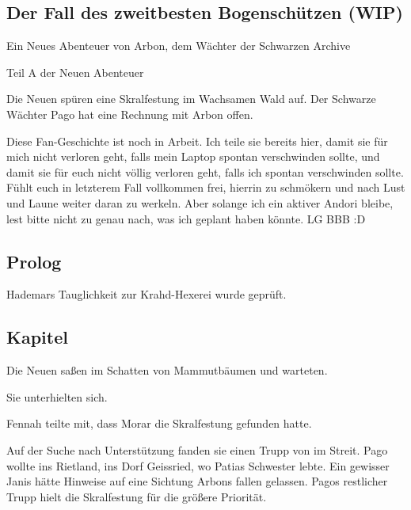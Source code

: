 \begin{chapterbox}
    \chapter{Der Fall des zweitbesten Bogenschützen (WIP)}
    \label{wip-der-fall-des-zweitbesten-bogenschuetzen}
    
    \begin{center}
        Ein Neues Abenteuer von Arbon, dem Wächter der Schwarzen Archive

        Teil A der Neuen Abenteuer
    \end{center}

    Die Neuen  spüren eine Skralfestung im Wachsamen Wald auf. Der Schwarze Wächter Pago hat eine Rechnung mit Arbon offen.
\end{chapterbox}



Diese Fan-Geschichte ist noch in Arbeit. Ich teile sie bereits hier, damit sie für mich nicht verloren geht, falls mein Laptop spontan verschwinden sollte, und damit sie für euch nicht völlig verloren geht, falls ich spontan verschwinden sollte. Fühlt euch in letzterem Fall vollkommen frei, hierrin zu schmökern und nach Lust und Laune weiter daran zu werkeln. Aber solange ich ein aktiver Andori bleibe, lest bitte nicht zu genau nach, was ich geplant haben könnte. LG BBB :D



\newpage
\section{Prolog}


Hademars Tauglichkeit zur Krahd-Hexerei wurde geprüft.



\newpage
\section{Kapitel}


Die Neuen  saßen im Schatten von Mammutbäumen und warteten.

Sie unterhielten sich.

Fennah teilte mit, dass Morar die Skralfestung gefunden hatte.

Auf der Suche nach Unterstützung fanden sie einen Trupp von  im Streit. Pago wollte ins Rietland, ins Dorf Geissried, wo Patias Schwester lebte. Ein gewisser Janis hätte Hinweise auf eine Sichtung Arbons fallen gelassen. Pagos restlicher Trupp hielt die Skralfestung für die größere Priorität.

